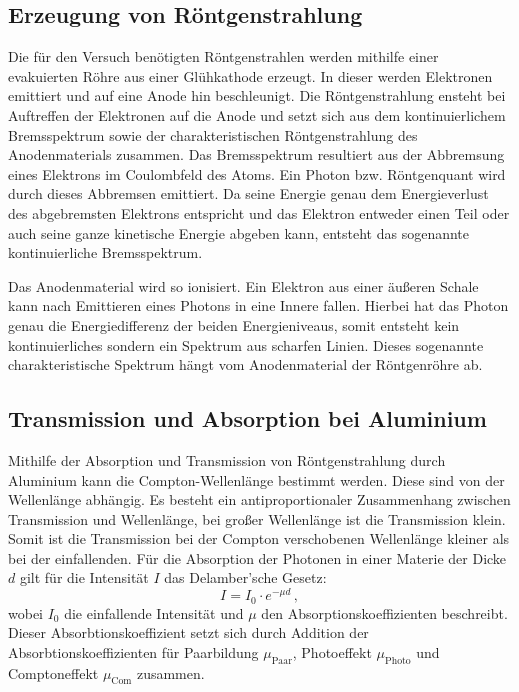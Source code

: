 \subsection{Erzeugung von Röntgenstrahlung}
\noindent
Die für den Versuch benötigten Röntgenstrahlen werden mithilfe einer evakuierten Röhre aus einer Glühkathode erzeugt.
In dieser werden  Elektronen emittiert und auf eine Anode hin beschleunigt.
Die Röntgenstrahlung ensteht bei Auftreffen der Elektronen auf die Anode und setzt sich aus dem kontinuierlichem Bremsspektrum sowie der charakteristischen Röntgenstrahlung des Anodenmaterials zusammen.
Das Bremsspektrum resultiert aus der Abbremsung eines Elektrons im Coulombfeld des Atoms.
Ein Photon bzw. Röntgenquant wird durch dieses Abbremsen emittiert.
Da seine Energie genau dem Energieverlust des abgebremsten Elektrons entspricht und das Elektron entweder einen Teil oder auch seine ganze kinetische Energie abgeben kann, entsteht das sogenannte kontinuierliche Bremsspektrum.

\noindent
Das Anodenmaterial wird so ionisiert.
Ein Elektron aus einer äußeren Schale kann nach Emittieren eines Photons in eine Innere fallen.
Hierbei hat das Photon genau die Energiedifferenz der beiden Energieniveaus, somit entsteht kein kontinuierliches sondern ein Spektrum aus scharfen Linien.
Dieses sogenannte charakteristische Spektrum hängt vom Anodenmaterial der Röntgenröhre ab.


\subsection{Transmission und Absorption bei Aluminium}
Mithilfe der Absorption und Transmission von Röntgenstrahlung durch Aluminium kann die Compton-Wellenlänge bestimmt werden.
Diese sind von der Wellenlänge abhängig.
Es besteht ein antiproportionaler Zusammenhang zwischen Transmission und Wellenlänge, bei großer Wellenlänge ist die Transmission klein.
Somit ist die Transmission bei der Compton verschobenen Wellenlänge kleiner als bei der einfallenden.
Für die Absorption der Photonen in einer Materie der Dicke $d$ gilt für die Intensität $I$ das Delamber'sche Gesetz:
\begin{equation*}
    I = I_0 \cdot e^{-\mu d} \, ,
\end{equation*}
wobei $I_0$ die einfallende Intensität und $\mu$ den Absorptionskoeffizienten beschreibt.
Dieser Absorbtionskoeffizient setzt sich durch Addition der Absorbtionskoeffizienten für Paarbildung $\mu_\text{Paar}$, Photoeffekt $\mu_\text{Photo}$ und Comptoneffekt $\mu_\text{Com}$ zusammen.

